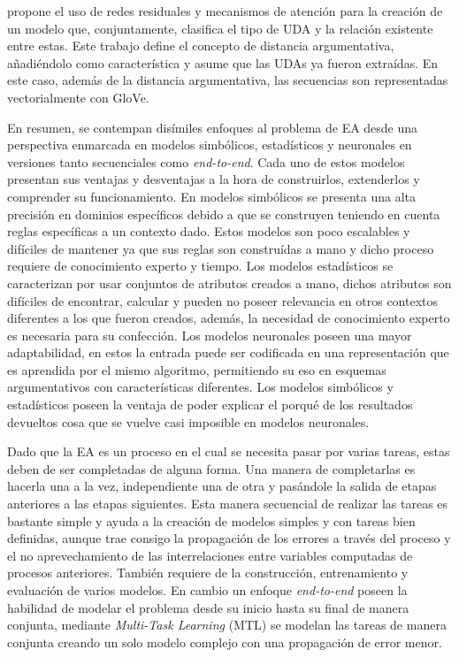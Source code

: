\textcite{galassi2021deep} propone el uso de redes residuales y mecanismos de atención
para la creación de un modelo que, conjuntamente, clasifica el tipo de UDA y la relación existente entre estas.
Este trabajo define el concepto de distancia argumentativa, añadiéndolo como característica y asume que las UDAs ya fueron 
extraídas. En este caso, además de la distancia argumentativa, las secuencias son representadas 
vectorialmente con GloVe.

En resumen, se contempan disímiles enfoques al problema de EA desde una perspectiva enmarcada en modelos 
simbólicos, estadísticos y neuronales en versiones tanto secuenciales como \emph{end-to-end}. 
Cada uno de estos modelos presentan sus ventajas y desventajas a la hora de construirlos, 
extenderlos y comprender su funcionamiento. En modelos simbólicos se presenta una alta
precisión en dominios específicos debido a que se construyen teniendo en cuenta reglas específicas a un
contexto dado. Estos modelos son poco escalables y difíciles de mantener ya que sus reglas son construídas
a mano y dicho proceso requiere de conocimiento experto y tiempo. Los modelos estadísticos 
se caracterizan por usar conjuntos de atributos creados a mano, dichos atributos son difíciles
de encontrar, calcular y pueden no poseer relevancia en otros contextos diferentes a los que fueron creados,
además, la necesidad de conocimiento experto es necesaria para su confección. Los modelos neuronales poseen
una mayor adaptabilidad, en estos la entrada puede ser codificada en una representación que es aprendida por
el mismo algoritmo, permitiendo su eso en esquemas argumentativos con características diferentes. Los modelos simbólicos y 
estadísticos poseen la ventaja de poder explicar el porqué de los resultados devueltos cosa que se vuelve casi
imposible en modelos neuronales.

Dado que la EA es un proceso en el cual se necesita pasar por varias tareas, estas deben de ser completadas
de alguna forma. Una manera de completarlas es hacerla una a la vez, independiente una de otra y pasándole
la salida de etapas anteriores a las etapas siguientes. Esta manera secuencial de realizar las 
tareas es bastante simple y ayuda a la creación de modelos simples y con tareas bien definidas, aunque trae consigo 
la propagación de los errores a través del proceso y el no aprevechamiento de las interrelaciones entre variables 
computadas de procesos anteriores. También requiere de la construcción, entrenamiento y evaluación de varios modelos.
En cambio un enfoque \emph{end-to-end} poseen la habilidad de modelar el problema 
desde su inicio hasta su final de manera conjunta, mediante \emph{Multi-Task Learning} (MTL) se modelan
las tareas de manera conjunta creando un solo modelo complejo con una propagación de error menor.

